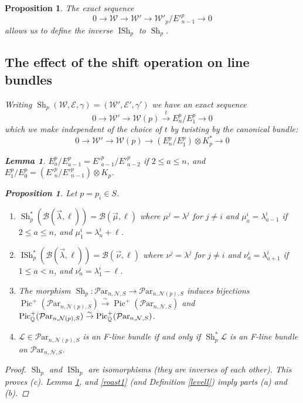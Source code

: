 \documentclass[11pt]{amsart}
\newcommand\Pic{\operatorname{Pic}}
\newcommand\me{\mathcal{E}}
\newcommand\tensor{\otimes}
\newcommand\ml{\mathcal{L}}
\newcommand\mw{\mathcal{W}}
\newcommand\mn{\mathcal{N}}
\newcommand\Par{\mathcal{P}\text{ar} }
\newcommand{\leto}[1]{\stackrel{#1}{\to}}
\newtheorem{proposition}[theorem]{Proposition}
\newtheorem{lemma}[theorem]{Lemma}
\numberwithin{theorem}{subsection}
\begin{document}
{\begin{proposition}
The exact sequence
$$0\to \mw \to \mw'\to \mw'_p/E'^p_{n-1}\to 0$$
allows us to define the inverse $\operatorname{ISh}_p$ to $\operatorname{Sh}_p$.
\subsection{The effect of the shift operation on line bundles}
Writing
$\operatorname{Sh}_p(\mw,\me,\gamma)=(\mw',\me',\gamma')$
we have an exact sequence
\begin{equation}\label{roast1}
0\to \mw'\to \mw(p)\leto{t} E^p_n/E^p_1\to 0
\end{equation}
which we make independent of the choice of $t$ by twisting by the canonical bundle:
\begin{equation}\label{roast}
0\to \mw'\to \mw(p)\to(E^p_n/E^p_1)\tensor K_p^*\to 0
\end{equation}
\begin{lemma}\label{phase}
$E^p_a/E^p_{a-1}=E'^p_{a-1}/E'^p_{a-2}$ if $2\leq a\leq n$, and $E^p_1/E^p_0=(E'^p_n/E'^p_{n-1})\tensor K_p$.
\end{lemma}

\begin{proposition}\label{easily}
Let $p=p_i\in S$.
\begin{enumerate}
\item[(a)] $\operatorname{Sh}_p^*(\mathcal{B}(\vec{\lambda},\ell))= \mathcal{B}(\vec{\mu},\ell)$
where $\mu^j=\lambda^j$ for $j\neq i$ and $\mu^i_a= \lambda^i_{a-1}$ if $2\leq a\leq n$, and $\mu^i_1=\lambda^i_{n}+\ell$.
\item[(b)] $\operatorname{ISh}_p^*(\mathcal{B}(\vec{\lambda},\ell))= \mathcal{B}(\vec{\nu},\ell)$
where $\nu^j=\lambda^j$ for $j\neq i$ and $\nu^i_a= \lambda^i_{a+1}$ if $1\leq a< n$, and $\nu^i_{n}=\lambda^i_{1}-\ell$.

\item[(c)]The morphism $\operatorname{Sh}_p: \Par_{n,\mn,S}\to \Par_{n,\mn(p),S}$ induces bijections $\Pic^+(\Par_{n,\mn(p),S})\leto{\sim}\Pic^+(\Par_{n,\mn,S})$ and
$\Pic^+_{\Bbb{Q}}(\Par_{n,\mn(p),S})\leto{\sim}\Pic^+_{\Bbb{Q}}(\Par_{n,\mn,S})$.
\item[(d)] $\ml\in  \Par_{n,\mn(p),S}$ is an F-line bundle if and only if $\operatorname{Sh}_p^*\ml$ is an F-line bundle on  $\Par_{n,\mn,S}$.
\end{enumerate}
\end{proposition}
\begin{proof}
$\operatorname{Sh}_p$ and $\operatorname{ISh}_p$ are isomorphisms (they are inverses of each other). This proves (c). Lemma \ref{phase}, and \eqref{roast1}  (and Definition  \ref{levell}) imply parts (a) and (b). \end{proof}


\end{proposition}}
\end{document}
